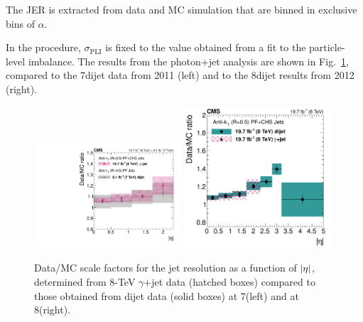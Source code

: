 \documentclass[11pt,twoside,a4paper,cmspaper,final,collab]{cms-tdr}
\begin{document}
The JER is extracted from data and MC simulation that are binned in exclusive bins of $\alpha$.

In the procedure, $\sigma_\mathrm{PLI}$ is fixed to the value obtained from a fit to the particle-level imbalance.
The results from the photon+jet analysis are shown in Fig.~\ref{fig:gjetjer}, compared to the 7\TeV dijet data from 2011 (left) and to the 8\TeV dijet results from 2012 (right).

\begin{figure}
\includegraphics[width=0.49\textwidth]{Figure_043-a.pdf}
\includegraphics[width=0.49\textwidth]{Figure_043-b.pdf}
\caption{\label{fig:gjetjer}
Data/MC scale factors for the jet \pt resolution as a function of $\lvert \eta \rvert$, determined from 8-TeV $\gamma$+jet data (hatched boxes) compared to those obtained from dijet data (solid boxes) at 7\TeV (left) and at 8\TeV (right).
}
\end{figure}
\end{document}
